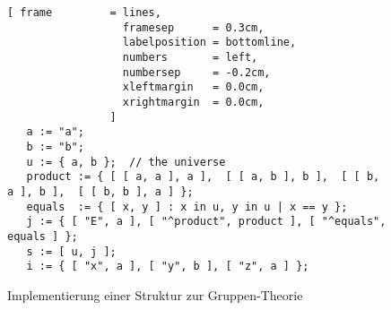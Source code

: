\begin{figure}[!ht]
\centering
\begin{Verbatim}[ frame         = lines, 
                  framesep      = 0.3cm, 
                  labelposition = bottomline,
                  numbers       = left,
                  numbersep     = -0.2cm,
                  xleftmargin   = 0.0cm,
                  xrightmargin  = 0.0cm,
                ]
   a := "a";
   b := "b"; 
   u := { a, b };  // the universe
   product := { [ [ a, a ], a ],  [ [ a, b ], b ],  [ [ b, a ], b ],  [ [ b, b ], a ] };
   equals  := { [ x, y ] : x in u, y in u | x == y };
   j := { [ "E", a ], [ "^product", product ], [ "^equals", equals ] };
   s := [ u, j ];
   i := { [ "x", a ], [ "y", b ], [ "z", a ] }; 
\end{Verbatim}
\vspace*{-0.3cm}
\caption{Implementierung einer Struktur zur Gruppen-Theorie}
\label{fig:gruppen.stl}
\end{figure}

